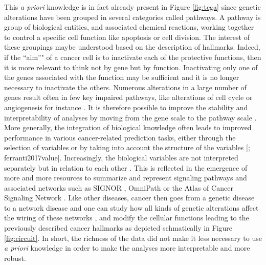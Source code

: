 \documentclass[a4paper,12pt,twoside,onecolumn,openright,final,oldfontcommands]{memoir}
\begin{document}
This \emph{a priori} knowledge is in fact already present in Figure
\ref{fig:tcga} since genetic alterations have been grouped in several
categories called pathways. A pathway is group of biological entities,
and associated chemical reactions, working together to control a
specific cell function like apoptosis or cell division. The interest of
these groupings maybe understood based on the description of hallmarks.
Indeed, if the ``aim''" of a cancer cell is to inactivate each of the
protective functions, then it is more relevant to think not by gene but
by function. Inactivating only one of the genes associated with the
function may be sufficient and it is no longer necessary to inactivate
the others. Numerous alterations in a large number of genes result often
in few key impaired pathways, like alterations of cell cycle or
angiogenesis for instance \citep{jones2008core}. It is therefore
possible to improve the stability and interpretability of analyses by
moving from the gene scale to the pathway scale
\citep{drier2013pathway}. More generally, the integration of biological
knowledge often leads to improved performance in various cancer-related
prediction tasks, either through the selection of variables or by taking
into account the structure of the variables
{[}\citet{bilal2013improving}; ferranti2017value{]}. Increasingly, the
biological variables are not interpreted separately but in relation to
each other \citep{barabasi2004network}. This is reflected in the
emergence of more and more resources to summarize and represent
signaling pathways and associated networks such as SIGNOR
\citep{perfetto2016signor}, OmniPath \citep{turei2016omnipath} or the
Atlas of Cancer Signaling Network \citep{kuperstein2015atlas}. Like
other diseases, cancer then goes from a genetic disease to a network
disease \citep{del2010diseases} and one can study how all kinds of
genetic alterations affect the wiring of these networks
\citep{pawson2007oncogenic}, and modify the cellular functions leading
to the previously described cancer hallmarks as depicted schmatically in
Figure \ref{fig:circuit}. In short, the richness of the data did not
make it less necessary to use \emph{a priori} knowledge in order to make
the analyses more interpretable and more robust.
\end{document}
